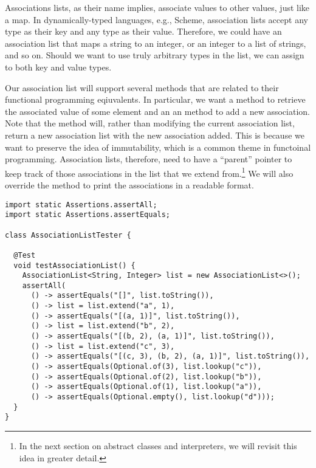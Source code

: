 
Associations lists, as their name implies, associate values to other values, just like a map. In dynamically-typed languages, e.g., Scheme, association lists accept any type as their key and any type as their value. Therefore, we could have an association list that maps a string to an integer, or an integer to a list of strings, and so on. Should we want to use truly arbitrary types in the list, we can assign  to both key and value types.

Our association list will support several methods that are related to their functional programming eqiuvalents. In particular, we want a  method to retrieve the associated value of some element and an an  method to add a new association. Note that the  method will, rather than modifying the current association list, return a new association list with the new association added. This is because we want to preserve the idea of immutability, which is a common theme in functoinal programming. Association lists, therefore, need to have a ``parent'' pointer to keep track of those associations in the list that we extend from.\footnote{In the next section on abstract classes and interpreters, we will revisit this idea in greater detail.} We will also override the  method to print the associations in a readable format. 

\begin{lstlisting}[language=MyJava]
import static Assertions.assertAll;
import static Assertions.assertEquals;

class AssociationListTester {

  @Test
  void testAssociationList() {
    AssociationList<String, Integer> list = new AssociationList<>();
    assertAll(
      () -> assertEquals("[]", list.toString()),
      () -> list = list.extend("a", 1),
      () -> assertEquals("[(a, 1)]", list.toString()),
      () -> list = list.extend("b", 2),
      () -> assertEquals("[(b, 2), (a, 1)]", list.toString()),
      () -> list = list.extend("c", 3),
      () -> assertEquals("[(c, 3), (b, 2), (a, 1)]", list.toString()),
      () -> assertEquals(Optional.of(3), list.lookup("c")),
      () -> assertEquals(Optional.of(2), list.lookup("b")),
      () -> assertEquals(Optional.of(1), list.lookup("a")),
      () -> assertEquals(Optional.empty(), list.lookup("d")));
  }
}
\end{lstlisting}

